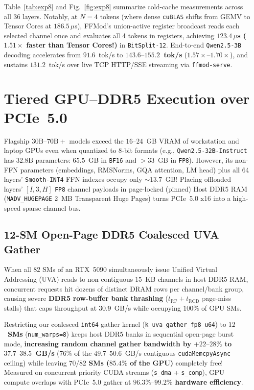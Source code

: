 \documentclass[10pt,twocolumn]{article}
\begin{document}
Table~\ref{tab:exp8} and Fig.~\ref{fig:exp8} summarize cold-cache measurements across all 36 layers. Notably, at $N=4$ tokens (where dense \texttt{cuBLAS} shifts from GEMV to Tensor Cores at $186.5\,\mu$s), FFMod's union-active register broadcast reads each selected channel once and evaluates all 4 tokens in registers, achieving \textbf{$123.4\,\mu$s ($1.51\times$ faster than Tensor Cores!)} in \texttt{BitSplit-12}. End-to-end \texttt{Qwen2.5-3B} decoding accelerates from $91.6$~tok/s to \textbf{$143.6\text{--}155.2$~tok/s} ($1.57\times\text{--}1.70\times$), and sustains $131.2$~tok/s over live TCP HTTP/SSE streaming via \texttt{ffmod-serve}.

\section{Tiered GPU--DDR5 Execution over PCIe~5.0}
\label{sec:tiered}

Flagship $30\text{B}\text{--}70\text{B}+$ models exceed the $16\text{--}24$~GB VRAM of workstation and laptop GPUs even when quantized to 8-bit formats (e.g., \texttt{Qwen2.5-32B-Instruct} has $32.8\text{B}$ parameters: $65.5$~GB in \texttt{BF16} and $>33$~GB in \texttt{FP8}). However, its non-FFN parameters (embeddings, RMSNorms, GQA attention, LM head) plus all 64 layers' \texttt{Smooth-INT4} FFN indexes occupy only $\sim 13.7$~GB! Placing offloaded layers' $[I, 3, H]$ \texttt{FP8} channel payloads in page-locked (pinned) Host DDR5 RAM (\texttt{MADV\_HUGEPAGE} 2~MB Transparent Huge Pages) turns PCIe~5.0 x16 into a high-speed sparse channel bus.

\subsection{12-SM Open-Page DDR5 Coalesced UVA Gather}
When all 82 SMs of an RTX~5090 simultaneously issue Unified Virtual Addressing (UVA) reads to non-contiguous $15$~KB channels in host DDR5 RAM, concurrent requests hit dozens of distinct DRAM rows per channel/bank group, causing severe \textbf{DDR5 row-buffer bank thrashing} ($t_{\mathrm{RP}}+t_{\mathrm{RCD}}$ page-miss stalls) that caps throughput at $30.9$~GB/s while occupying $100\%$ of GPU SMs.

Restricting our coalesced \texttt{int64} gather kernel (\texttt{k\_uva\_gather\_fp8\_u64}) to \textbf{$12$~SMs} (\texttt{num\_warps=8}) keeps host DDR5 banks in sequential open-page burst mode, \textbf{increasing random channel gather bandwidth by $+22\text{--}28\%$ to $37.7\text{--}38.5$~GB/s} ($76\%$ of the $49.7\text{--}50.6$~GB/s contiguous \texttt{cudaMemcpyAsync} ceiling) while leaving \textbf{$70/82$ SMs ($85.4\%$ of the GPU)} completely free! Measured on concurrent priority CUDA streams (\texttt{s\_dma} + \texttt{s\_comp}), GPU compute overlaps with PCIe~5.0 gather at \textbf{$96.3\%\text{--}99.2\%$ hardware efficiency}.
\end{document}
